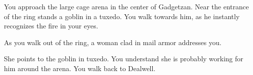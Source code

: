 


You approach the large cage arena in the center of Gadgetzan. Near the entrance of the ring stands a goblin in a tuxedo. You walk towards him, as he instantly recognizes the fire in your eyes.












As you walk out of the ring, a woman clad in mail armor addresses you.


She points to the goblin in tuxedo. You understand she is probably working for him around the arena. You walk back to Dealwell.

